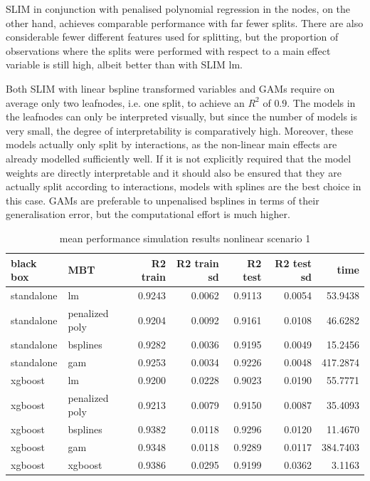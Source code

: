 SLIM in conjunction with penalised polynomial regression in the nodes, on the other hand, achieves comparable performance with far fewer splits.
There are also considerable fewer different features used for splitting, but the proportion of observations where the splits were performed with respect to a main effect variable is still high, albeit better than with SLIM lm.

Both SLIM with linear bspline transformed variables and GAMs require on average only two leafnodes, i.e. one split, to achieve an $R^2$ of $0.9$. The models in the leafnodes can only be interpreted visually, but since the number of models is very small, the degree of interpretability is comparatively high. Moreover, these models actually only split by interactions, as the non-linear main effects are already modelled sufficiently well. If it is not explicitly required that the model weights are directly interpretable and it should also be ensured that they are actually split according to interactions, models with splines are the best choice in this case. GAMs are preferable to unpenalised bsplines in terms of their generalisation error, but the computational effort is much higher.




\begin{table}[!htb]

\caption{mean performance simulation results nonlinear scenario 1}
\centering \tiny
\begin{tabular}[t]{l|l|r|r|r|r|r}
\hline
black box & MBT & R2 train & R2 train sd & R2 test & R2 test sd & time\\
\hline
standalone & lm & 0.9243 & 0.0062 & 0.9113 & 0.0054 & 53.9438\\
standalone & penalized poly & 0.9204 & 0.0092 & 0.9161 & 0.0108 & 46.6282\\
standalone & bsplines & 0.9282 & 0.0036 & 0.9195 & 0.0049 & 15.2456\\
standalone & gam & 0.9253 & 0.0034 & 0.9226 & 0.0048 & 417.2874\\
\hline
xgboost & lm & 0.9200 & 0.0228 & 0.9023 & 0.0190 & 55.7771\\
xgboost & penalized poly & 0.9213 & 0.0079 & 0.9150 & 0.0087 & 35.4093\\
xgboost & bsplines & 0.9382 & 0.0118 & 0.9296 & 0.0120 & 11.4670\\
xgboost & gam & 0.9348 & 0.0118 & 0.9289 & 0.0117 & 384.7403\\
\hline
xgboost & xgboost & 0.9386 & 0.0295 & 0.9199 & 0.0362 & 3.1163\\
\hline
\end{tabular}
\end{table}




